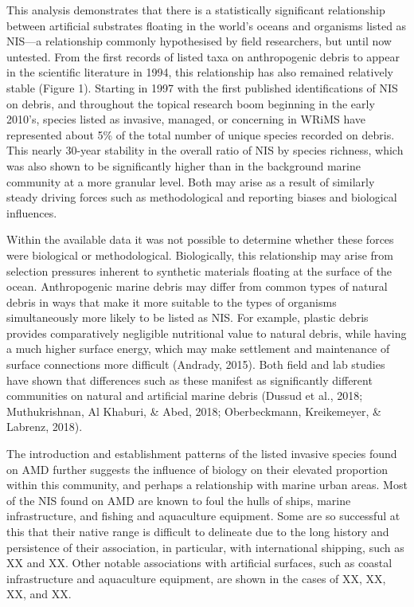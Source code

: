 \documentclass[a4paper, nobind]{templates/ociamthesis}
\begin{document}
This analysis demonstrates that there is a statistically significant relationship between artificial substrates floating in the world's oceans and organisms listed as NIS---a relationship commonly hypothesised by field researchers, but until now untested. From the first records of listed taxa on anthropogenic debris to appear in the scientific literature in 1994, this relationship has also remained relatively stable (Figure 1). Starting in 1997 with the first published identifications of NIS on debris, and throughout the topical research boom beginning in the early 2010's, species listed as invasive, managed, or concerning in WRiMS have represented about 5\% of the total number of unique species recorded on debris. This nearly 30-year stability in the overall ratio of NIS by species richness, which was also shown to be significantly higher than in the background marine community at a more granular level. Both may arise as a result of similarly steady driving forces such as methodological and reporting biases and biological influences.

Within the available data it was not possible to determine whether these forces were biological or methodological. Biologically, this relationship may arise from selection pressures inherent to synthetic materials floating at the surface of the ocean. Anthropogenic marine debris may differ from common types of natural debris in ways that make it more suitable to the types of organisms simultaneously more likely to be listed as NIS. For example, plastic debris provides comparatively negligible nutritional value to natural debris, while having a much higher surface energy, which may make settlement and maintenance of surface connections more difficult (Andrady, 2015). Both field and lab studies have shown that differences such as these manifest as significantly different communities on natural and artificial marine debris (Dussud et al., 2018; Muthukrishnan, Al Khaburi, \& Abed, 2018; Oberbeckmann, Kreikemeyer, \& Labrenz, 2018).

The introduction and establishment patterns of the listed invasive species found on AMD further suggests the influence of biology on their elevated proportion within this community, and perhaps a relationship with marine urban areas. Most of the NIS found on AMD are known to foul the hulls of ships, marine infrastructure, and fishing and aquaculture equipment. Some are so successful at this that their native range is difficult to delineate due to the long history and persistence of their association, in particular, with international shipping, such as XX and XX. Other notable associations with artificial surfaces, such as coastal infrastructure and aquaculture equipment, are shown in the cases of XX, XX, XX, and XX.
\end{document}
